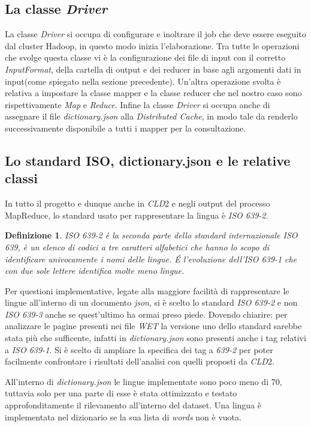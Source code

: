\documentclass{article}
\newcommand{\MR}{MapReduce}
\newcommand{\cld}{\textit{CLD}2}
\newcommand{\WET}{\textit{WET}}
\newcommand{\DC}{\textit{Distributed Cache}}
\newcommand{\isoOne}{\textit{ISO 639-1}}
\newcommand{\isoTwo}{\textit{ISO 639-2}}
\newcommand{\isoThree}{\textit{ISO 639-3}}
\newcommand{\filename}[1]{\textit{#1}}
\newcommand{\class}[1]{\textit{#1}}
\newtheorem*{definition}{Definizione}
\begin{document}
\subsection{La classe \textit{Driver}}
La classe \class{Driver} si occupa di configurare e inoltrare il job che deve essere eseguito dal cluster Hadoop, in questo modo inizia l'elaborazione. Tra tutte le operazioni che svolge questa classe vi è la configurazione dei file di input con il corretto \textit{InputFormat}, della cartella di output e dei reducer in base agli argomenti dati in input(come spiegato nella sezione precedente). Un'altra operazione svolta è relativa a impostare la classe mapper e la classe reducer che nel nostro caso sono rispettivamente \filename{Map} e \filename{Reduce}. Infine la classe \filename{Driver} si occupa anche di assegnare il file \filename{dictionary.json} alla \DC{}, in modo tale da renderlo successivamente disponibile a tutti i mapper per la consultazione.

\subsection{Lo standard ISO, dictionary.json e le relative classi}
In tutto il progetto e dunque anche in \cld{} e negli output del processo \MR{}, lo standard usato per rappresentare la lingua è \isoTwo{}.

\begin{definition}
ISO 639-2 è la seconda parte dello standard internazionale ISO 639, è un elenco di codici a tre caratteri alfabetici che hanno lo scopo di identificare univocamente i nomi delle lingue. \'E l'evoluzione dell'ISO 639-1 che con due sole lettere identifica molte meno lingue. 
\end{definition}

Per questioni implementative, legate alla maggiore facilità di rappresentare le lingue all'interno di un documento \textit{json}, si è scelto lo standard \isoTwo{} e non \isoThree{} anche se quest'ultimo ha ormai preso piede. Dovendo chiarire: per analizzare le pagine presenti nei file \WET{} la versione uno dello standard sarebbe stata più che sufficente, infatti in \filename{dictionary.json} sono presenti anche i tag relativi a \isoOne. Si è scelto di ampliare la specifica dei tag a \textit{639-2} per poter facilmente confrontare i risultati dell'analisi con quelli proposti da \cld{}.

All'interno di \filename{dictionary.json} le lingue implementate sono poco meno di 70, tuttavia solo per una parte di esse è stata ottimizzato e testato approfonditamente il rilevamento all'interno del dataset. Una lingua è implementata nel dizionario se la sua lista di \textit{words} non è vuota.
\end{document}

